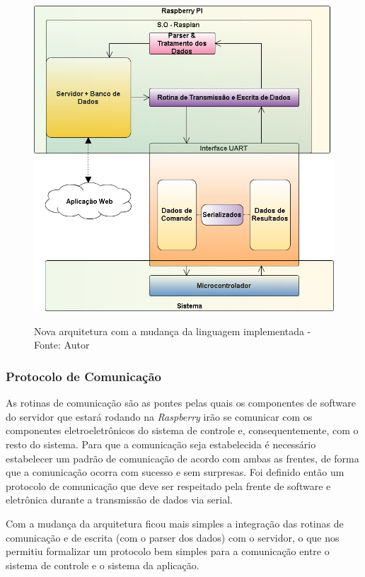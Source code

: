 \begin{figure}[H]
\centering
\includegraphics[keepaspectratio=true,scale=0.7]{figuras/nova_arquitetura.png}
\label{fig:nova_arquitetura}
\caption{Nova arquitetura com a mudança da linguagem implementada - Fonte: Autor}
\end{figure}

\subsubsection*{\textbf{Protocolo de Comunicação}} \label{software:protocolo}

As rotinas de comunicação são as pontes pelas quais os componentes de software do servidor que estará rodando na \textit{Raspberry} irão se
comunicar com os componentes eletroeletrônicos do sistema de controle e, consequentemente, com o resto do sistema. 
Para que a comunicação seja estabelecida é necessário estabelecer um padrão de comunicação de acordo com ambas as frentes, de forma que a comunicação 
ocorra com sucesso e sem surpresas. Foi definido então um protocolo de comunicação que deve ser respeitado pela frente de software e
eletrônica durante a transmissão de dados via serial.

Com a mudança da arquitetura ficou mais simples a integração das rotinas de comunicação e de escrita (com o parser dos dados) com o
servidor, o que nos permitiu formalizar um protocolo bem simples para a comunicação entre o sistema de controle e o sistema da aplicação.

